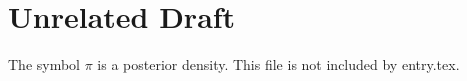 \section{Unrelated Draft}
The symbol $\pi$ is a posterior density. This file is not included by entry.tex.
